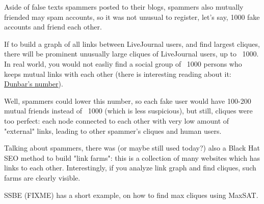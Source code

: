 Aside of false texts spammers posted to their blogs, spammers also mutually friended may spam accounts, so it was not unusual to register, let's say, 1000 fake
accounts and friend each other.

If to build a graph of all links between LiveJournal users, and find largest cliques, there will be prominent unusually large cliques of LiveJournal users, 
up to ~1000.
In real world, you would not easliy find a social group of ~1000 persons who keeps mutual links with each other 
(there is interesting reading about it: \href{https://en.wikipedia.org/w/index.php?title=Dunbar%27s_number}{Dunbar's number}).

Well, spammers could lower this number, so each fake user would have 100-200 mutual friends instead of ~1000 (which is less suspicious), but still, 
cliques were too perfect: each node connected to each other with very low
amount of "external" links, leading to other spammer's cliques and human users.


Talking about spammers, there was (or maybe still used today?) also a Black Hat SEO method to build 
"link farms":
this is a collection of many websites which has links to each other.
Interestingly, if you analyze link graph and find cliques, such farms are clearly visible.


SSBE (FIXME) has a short example, on how to find max cliques using MaxSAT.

\levelup{}

